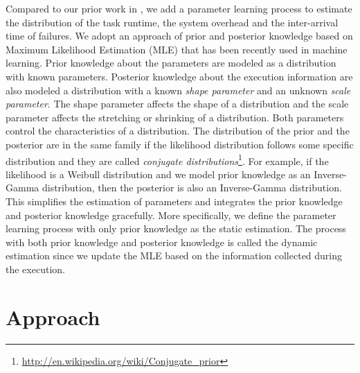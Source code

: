 Compared to our prior work in \cite{Chen2012}, we add a parameter learning process to estimate the distribution of the task runtime, the system overhead and the inter-arrival time of failures. We adopt an approach of prior and posterior knowledge based on Maximum Likelihood Estimation (MLE) that has been recently used in machine learning. Prior knowledge about the parameters are modeled as a distribution with known parameters. Posterior knowledge about the execution information are also modeled a distribution with a known \emph{shape parameter} and an unknown \emph{scale parameter}. The shape parameter affects the shape of a distribution and the scale parameter affects the stretching or shrinking of a distribution. Both parameters control the characteristics of a distribution. The distribution of the prior and the posterior are in the same family if the likelihood distribution follows some specific distribution and they are called \emph{conjugate distributions}\footnote{\url{http://en.wikipedia.org/wiki/Conjugate_prior}}. For example, if the likelihood is a Weibull distribution and we model prior knowledge as an Inverse-Gamma distribution, then the posterior is also an Inverse-Gamma distribution. This simplifies the estimation of parameters and integrates the prior knowledge and posterior knowledge gracefully. More specifically, we define the parameter learning process with only prior knowledge as the static estimation. The process with both prior knowledge and posterior knowledge is called the dynamic estimation since we update the MLE based on the information collected during the execution.  



\section{Approach}


